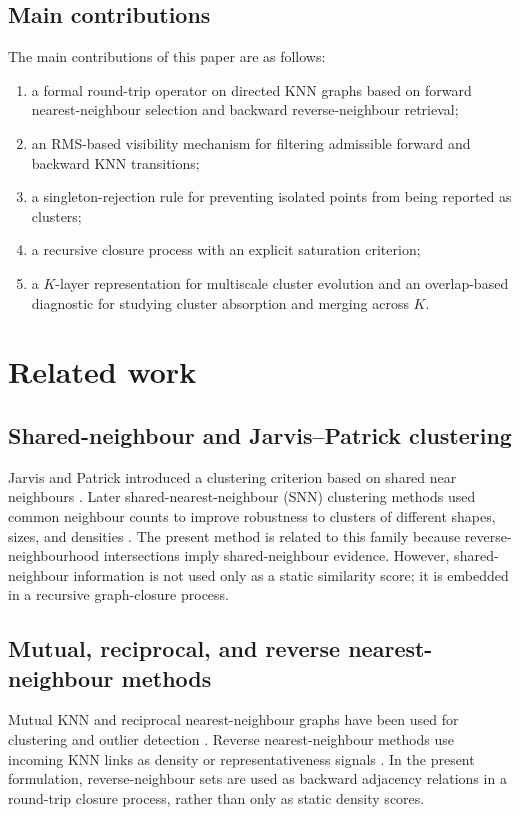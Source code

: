 \documentclass[pdflatex,sn-mathphys-num]{sn-jnl}
\begin{document}
\subsection{Main contributions}

The main contributions of this paper are as follows:
\begin{enumerate}
\item a formal round-trip operator on directed KNN graphs based on forward nearest-neighbour selection and backward reverse-neighbour retrieval;
\item an RMS-based visibility mechanism for filtering admissible forward and backward KNN transitions;
\item a singleton-rejection rule for preventing isolated points from being reported as clusters;
\item a recursive closure process with an explicit saturation criterion;
\item a $K$-layer representation for multiscale cluster evolution and an overlap-based diagnostic for studying cluster absorption and merging across $K$.
\end{enumerate}

\section{Related work}\label{sec:related}

\subsection{Shared-neighbour and Jarvis--Patrick clustering}

Jarvis and Patrick introduced a clustering criterion based on shared near neighbours \citep{JarvisPatrick1973}. Later shared-nearest-neighbour (SNN) clustering methods used common neighbour counts to improve robustness to clusters of different shapes, sizes, and densities \citep{ErtozSteinbachKumar2003}. The present method is related to this family because reverse-neighbourhood intersections imply shared-neighbour evidence. However, shared-neighbour information is not used only as a static similarity score; it is embedded in a recursive graph-closure process.

\subsection{Mutual, reciprocal, and reverse nearest-neighbour methods}

Mutual KNN and reciprocal nearest-neighbour graphs have been used for clustering and outlier detection \citep{BritoChavezQuirozYukich1997,GowdaKrishna1978,SardanaBhatnagar2014}. Reverse nearest-neighbour methods use incoming KNN links as density or representativeness signals \citep{ChowdhuryAmorim2018}. In the present formulation, reverse-neighbour sets are used as backward adjacency relations in a round-trip closure process, rather than only as static density scores.
\end{document}
